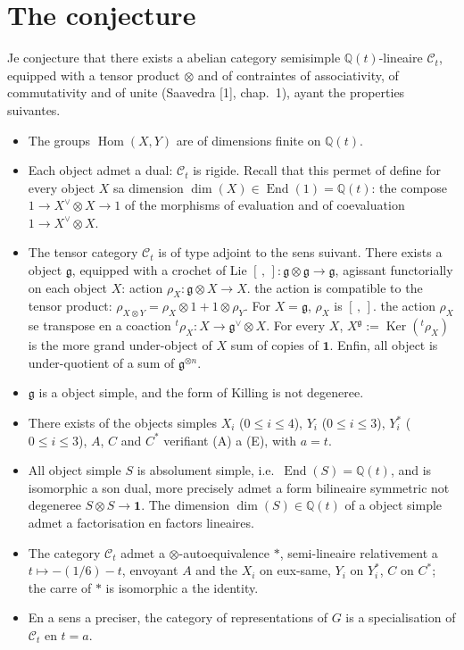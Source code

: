 \documentclass[11pt,a4paper]{article}
\DeclareMathOperator{\Hom}{Hom}
\DeclareMathOperator{\Ker}{Ker}
\DeclareMathOperator{\End}{End}
\newcommand{\frg}{\mathfrak{g}}
\newcommand{\Q}{\mathbb{Q}}
\begin{document}
\section*{The conjecture}

Je conjecture that there exists a abelian category semisimple $\Q(t)$-lineaire $\mathcal{C}_t$, equipped with a tensor product $\otimes$ and of contraintes of associativity, of commutativity and of unite (Saavedra [1], chap.~1), ayant the properties suivantes.

\begin{itemize}
\item[(i)] The groups $\Hom(X, Y)$ are of dimensions finite on $\Q(t)$.

\item[(ii)] Each object admet a dual: $\mathcal{C}_t$ is rigide. Recall that this permet of define for every object $X$ sa dimension $\dim(X) \in \End(1) = \Q(t)$: the compose $1 \to X^\vee \otimes X \to 1$ of the morphisms of evaluation and of coevaluation $1 \to X^\vee \otimes X$.

\item[(iii)] The tensor category $\mathcal{C}_t$ is of type adjoint to the sens suivant. There exists a object $\frg$, equipped with a crochet of Lie $[\, , \,]: \frg \otimes \frg \to \frg$, agissant functorially on each object $X$: action $\rho_X: \frg \otimes X \to X$. the action is compatible to the tensor product: $\rho_{X \otimes Y} = \rho_X \otimes 1 + 1 \otimes \rho_Y$. For $X = \frg$, $\rho_X$ is $[\, , \,]$. the action $\rho_X$ se transpose en a coaction $^t\!\rho_X: X \to \frg^\vee \otimes X$. For every $X$, $X^\frg := \Ker({}^t\!\rho_X)$ is the more grand under-object of $X$ sum of copies of $\mathbf{1}$. Enfin, all object is under-quotient of a sum of $\frg^{\otimes n}$.

\item[(iv)] $\frg$ is a object simple, and the form of Killing is not degeneree.

\item[(v)] There exists of the objects simples $X_i$ ($0 \leq i \leq 4$), $Y_i$ ($0 \leq i \leq 3$), $Y_i^*$ ($0 \leq i \leq 3$), $A$, $C$ and $C^*$ verifiant (A) a (E), with $a = t$.

\item[(vi)] All object simple $S$ is absolument simple, i.e.~$\End(S) = \Q(t)$, and is isomorphic a son dual, more precisely admet a form bilineaire symmetric not degeneree $S \otimes S \to \mathbf{1}$. The dimension $\dim(S) \in \Q(t)$ of a object simple admet a factorisation en factors lineaires.

\item[(vii)] The category $\mathcal{C}_t$ admet a $\otimes$-autoequivalence $*$, semi-lineaire relativement a $t \mapsto -(1/6) - t$, envoyant $A$ and the $X_i$ on eux-same, $Y_i$ on $Y_i^*$, $C$ on $C^*$; the carre of $*$ is isomorphic a the identity.

\item[(viii)] En a sens a preciser, the category of representations of $G$ is a specialisation of $\mathcal{C}_t$ en $t = a$.
\end{itemize}
\end{document}
